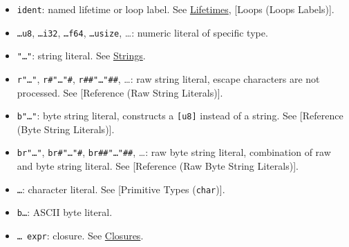 \documentclass[a4paper,]{book}
\providecommand{\tightlist}{%
  \setlength{\itemsep}{0pt}\setlength{\parskip}{0pt}}
\begin{document}
\begin{itemize}
\tightlist
\item
  \texttt{\textquotesingle{}ident}: named lifetime or loop label. See
  \protect\hyperlink{lifetimes}{Lifetimes}, {[}Loops (Loops Labels){]}.
\item
  \texttt{\ldots{}u8}, \texttt{\ldots{}i32}, \texttt{\ldots{}f64},
  \texttt{\ldots{}usize}, \ldots{}: numeric literal of specific type.
\item
  \texttt{"\ldots{}"}: string literal. See
  \protect\hyperlink{sec--strings}{Strings}.
\item
  \texttt{r"\ldots{}"}, \texttt{r\#"\ldots{}"\#},
  \texttt{r\#\#"\ldots{}"\#\#}, \ldots{}: raw string literal, escape
  characters are not processed. See {[}Reference (Raw String
  Literals){]}.
\item
  \texttt{b"\ldots{}"}: byte string literal, constructs a
  \texttt{{[}u8{]}} instead of a string. See {[}Reference (Byte String
  Literals){]}.
\item
  \texttt{br"\ldots{}"}, \texttt{br\#"\ldots{}"\#},
  \texttt{br\#\#"\ldots{}"\#\#}, \ldots{}: raw byte string literal,
  combination of raw and byte string literal. See {[}Reference (Raw Byte
  String Literals){]}.
\item
  \texttt{\textquotesingle{}\ldots{}\textquotesingle{}}: character
  literal. See {[}Primitive Types (\texttt{char}){]}.
\item
  \texttt{b\textquotesingle{}\ldots{}\textquotesingle{}}: ASCII byte
  literal.
\item
  \texttt{\textbar{}\ldots{}\textbar{}\ expr}: closure. See
  \protect\hyperlink{sec--closures}{Closures}.
\end{itemize}
\end{document}
